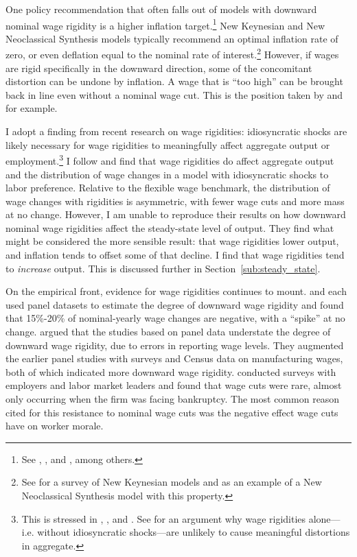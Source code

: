 \documentclass[12pt,a4paper]{scrartcl}            %
\begin{document}
One policy recommendation that often falls out of models with downward nominal wage rigidity is a higher inflation target.\footnote{
    See \cite{tobin_1972}, \cite{akerlof_dickens_perry_1996}, and \cite{kim_ruge-murcia_2011}, among others.
}
New Keynesian and New Neoclassical Synthesis models typically recommend an optimal inflation rate of zero, or even deflation equal to the nominal rate of interest.\footnote{
    See \cite{schmitt-grohe_uribe_2010} for a survey of New Keynesian models and \cite{goodfriend_king_2001} as an example of a New Neoclassical Synthesis model with this property.
}
However, if wages are rigid specifically in the downward direction, some of the concomitant distortion can be undone by inflation.
A wage that is ``too high'' can be brought back in line even without a nominal wage cut.
This is the position taken by \cite{tobin_1972} and \cite{akerlof_dickens_perry_1996} for example.

I adopt a finding from recent research on wage rigidities: idiosyncratic shocks are likely necessary for wage rigidities to meaningfully affect aggregate output or employment.\footnote{
    This is stressed in \cite{elsby_2009}, \cite{benigno_ricci_2011}, and \cite{daly_hobijn_2013}.
    See \cite{goodfriend_king_2001} for an argument why wage rigidities alone---i.e. without idiosyncratic shocks---are unlikely to cause meaningful distortions in aggregate.
}
I follow \cite{daly_hobijn_2013} and find that wage rigidities do affect aggregate output and the distribution of wage changes in a model with idiosyncratic shocks to labor preference.
Relative to the flexible wage benchmark, the distribution of wage changes with rigidities is asymmetric, with fewer wage cuts and more mass at no change.
However, I am unable to reproduce their results on how downward nominal wage rigidities affect the steady-state level of output.
They find what might be considered the more sensible result: that wage rigidities lower output, and inflation tends to offset some of that decline.
I find that wage rigidities tend to \emph{increase} output.
This is discussed further in Section~\eqref{sub:steady_state}.

On the empirical front, evidence for wage rigidities continues to mount.
\cite{mclaughlin_1994} and \cite{card_hyslop_1997} each used panel datasets to estimate the degree of downward wage rigidity and found that 15\%-20\% of nominal-yearly wage changes are negative, with a ``spike'' at no change.
\cite{akerlof_dickens_perry_1996} argued that the studies based on panel data understate the degree of downward wage rigidity, due to errors in reporting wage levels.
They augmented the earlier panel studies with surveys and Census data on manufacturing wages, both of which indicated more downward wage rigidity.
\cite{bewley_1999} conducted surveys with employers and labor market leaders and found that wage cuts were rare, almost only occurring when the firm was facing bankruptcy.
The most common reason cited for this resistance to nominal wage cuts was the negative effect wage cuts have on worker morale.
\end{document}
